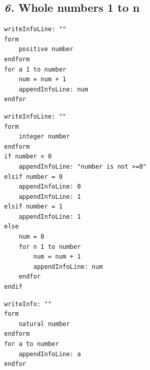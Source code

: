 \documentclass[12pt, english]{article}
\begin{document}
\subsection*{\emph{6.} Whole numbers 1 to n}

\begin{lstlisting}
writeInfoLine: ""
form
    positive number
endform
for a 1 to number
    num = num + 1
    appendInfoLine: num
endfor
\end{lstlisting}

\begin{lstlisting}[title=\textbf{Or:}]
writeInfoLine: ""
form
    integer number
endform
if number < 0
    appendInfoLine: "number is not >=0"
elsif number = 0
    appendInfoLine: 0
    appendInfoLine: 1
elsif number = 1
    appendInfoLine: 1
else
    num = 0
    for n 1 to number
        num = num + 1
        appendInfoLine: num
    endfor
endif
\end{lstlisting}

\begin{lstlisting}[rulesepcolor=\color{blue}]
writeInfo: ""
form
    natural number
endform
for a to number
    appendInfoLine: a
endfor
\end{lstlisting}

\vspace{10pt}
\end{document}
